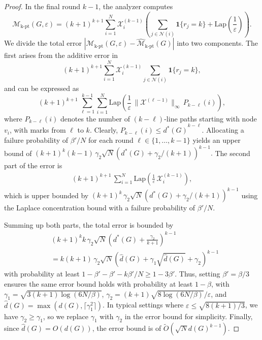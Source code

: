 \begin{proof}
In the final round $k{-}1$, the analyzer computes
\[
    \mathcal{M}_{\mathrm{k\text{-}pt}}(G, \varepsilon) =(k+1)^{k+1}
    \sum_{i=1}^N 
    \mathcal{X}^{(k-1)}_i
    \left(
        \sum_{j \in \mathcal{N}(i)} \mathbf{1}\{r_j = k\}
        + \mathrm{Lap}(\frac{1}{\varepsilon})
   \right).
\]
We divide the total error $|\mathcal{M}_{\mathrm{k\text{-}pt}}(G, \varepsilon) - 
    \widehat{\mathcal{M}}_{\mathrm{k\text{-}pt}}(G)|$ into two components. 
    The first arises from the additive error in 
\[
(k+1)^{k+1} \sum_{i=1}^N\mathcal{X}_i^{(k-1)} \sum_{j \in \mathcal{N}(i)}\mathbf{1}\{r_j = k\},
\]
and can be expressed as
\begin{equation*}
    (k+1)^{k+1} \, \sum_{\ell=1}^{k-1} \sum_{i=1}^N  
   \mathrm{Lap}(
   \frac{1}{\varepsilon} 
   \,
    \|\mathcal{X}^{(\ell-1)}\|_\infty   \,
   {P}_{k-\ell}(i)
   ),
\end{equation*}
where ${P}_{k-\ell}(i)$ denotes the number of $(k{-}\ell)$-line paths starting with node $v_i$, with marks from $\ell$ to $k$. 
Clearly, ${P}_{k-\ell}(i) \leq {d^*(G)}^{k-\ell}$.
Allocating a failure probability of $\beta'/N$ for each round $\ell \in \{1, \dots, k{-}1\}$ yields an upper bound of 
$
   (k+1)^{k}(k-1) \,  \gamma_2  \sqrt{N}(d^*(G) + {\gamma_2}/({k+1}))^{k-1}.
$
The second part of the error is
   \begin{align*}
 (k+1)^{k+1}
 \,
 \sum_{i=1}^N  \mathrm{Lap}(\frac{1}{\varepsilon} \, \mathcal{X}^{(k -1)}_i),
\end{align*}
which is upper bounded by $
     (k+1)^{k} \, \gamma_2 \sqrt{N}(d^*(G) + {\gamma_2}/{(k+1)})^{k-1}
$
using the Laplace concentration bound with a failure probability of $\beta'/N$. 




Summing up both parts, the total error is bounded by
\begin{align*}
 &(k+1)^{k} k \, \gamma_2 \sqrt{N}(d^*(G) + \frac{\gamma_2}{k+1})^{k-1} \\
   &= {k(k+1)} \, \gamma_2 \sqrt{N}(\hat{d}(G) + \gamma_1\sqrt{\hat{d}(G)} + \gamma_2)^{k-1}
\end{align*}
with probability at least $1- \beta'-\beta' -k\beta'/N \geq 1-3\beta'$. 
Thus, setting $\beta' = \beta/3$ ensures the same error bound holds with probability at least $1-\beta$, with
$\gamma_1 = \sqrt{3(k+1)\log(6N/\beta)}$, $\gamma_2 = (k+1)\sqrt{8\log(6N/\beta)}/\varepsilon$, and $\hat{d}(G) = \max(d(G), \lceil \gamma_1^2 \rceil)$.
In typical settings where $\varepsilon \leq \sqrt{8(k+1)/3}$, we have $\gamma_2 \geq \gamma_1$, so we replace $\gamma_1$ with $\gamma_2$ in the error bound for simplicity.
Finally, since $\hat{d}(G) = O(d(G))$, the error bound is of 
$\tilde{O}(\sqrt{N}d(G)^{k-1})$. \qedhere

\end{proof}




